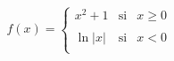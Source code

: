 \documentclass{article} %
\begin{document}
\[f(x)=\left\{ \begin{array}{rcl}
x^2+1 & \mbox{si} & x\geq 0\\
& & \\
\ln|x| & \mbox{si} & x< 0\\
\end{array}
\right. \] %
\end{document}
